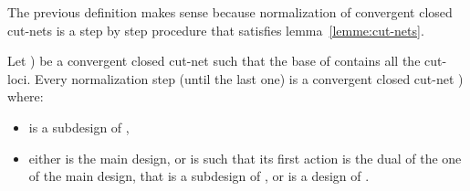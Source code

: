 \documentclass{LMCS}
\begin{document}
The previous definition makes sense because normalization of convergent closed cut-nets is a step by step procedure that satisfies lemma~\ref{lemme:cut-nets}.

\begin{lem}\label{lemme:cut-nets}
Let ) be a convergent closed cut-net such that the base of  contains all the cut-loci.
Every normalization step (until the last one) is a convergent closed
cut-net  ) where:
\begin{itemize}[label=]
\item  is a subdesign of ,
\item either  is the main design, or  is
  such that its first action is the dual of the one of the main
  design, that is a subdesign of , or  is a design
  of .
\end{itemize}
\end{lem}
\end{document}
